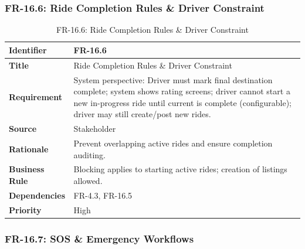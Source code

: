 \subsubsection{FR-16.6: Ride Completion Rules \& Driver Constraint}

\begin{longtable}{|p{3cm}|p{12cm}|}
\caption{FR-16.6: Ride Completion Rules \& Driver Constraint}
\label{tab:fr-16-6} \\
\hline
\rowcolor{lightgray!30}
\textbf{Identifier} & FR-16.6 \\
\hline
\textbf{Title} & Ride Completion Rules \& Driver Constraint \\
\hline
\textbf{Requirement} & System perspective: Driver must mark final destination complete; system shows rating screens; driver cannot start a new in-progress ride until current is complete (configurable); driver may still create/post new rides. \\
\hline
\textbf{Source} & Stakeholder \\
\hline
\textbf{Rationale} & Prevent overlapping active rides and ensure completion auditing. \\
\hline
\textbf{Business Rule} & Blocking applies to starting active rides; creation of listings allowed. \\
\hline
\textbf{Dependencies} & FR-4.3, FR-16.5 \\
\hline
\textbf{Priority} & High \\
\hline
\end{longtable}

\subsubsection{FR-16.7: SOS \& Emergency Workflows}

